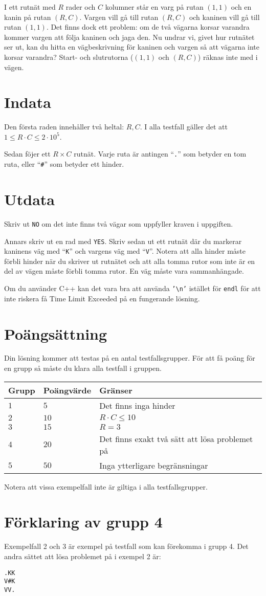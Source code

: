I ett rutnät med $R$ rader och $C$ kolumner står en varg på rutan $(1, 1)$ och en kanin på rutan $(R, C)$.
Vargen vill gå till rutan $(R, C)$ och kaninen vill gå till rutan $(1, 1)$.
Det finns dock ett problem: om de två vägarna korsar varandra kommer vargen att följa kaninen och jaga den.
Nu undrar vi, givet hur rutnätet ser ut, kan du hitta en vägbeskrivning för kaninen och vargen så att vägarna inte korsar varandra?
Start- och slutrutorna ($(1, 1)$ och $(R, C)$) räknas inte med i vägen.

\section*{Indata}
Den första raden innehåller två heltal: $R, C$. I alla testfall gäller det att $1 \leq R \cdot C \leq 2 \cdot 10^5$.

Sedan föjer ett $R \times C$ rutnät. Varje ruta är antingen ``\texttt{.}'' som betyder en tom ruta, eller ``\texttt{\#}'' som betyder ett hinder.

\section*{Utdata}
Skriv ut \texttt{NO} om det inte finns två vägar som uppfyller kraven i uppgiften.

Annars skriv ut en rad med \texttt{YES}.
Skriv sedan ut ett rutnät där du markerar kaninens väg med ``\texttt{K}'' och vargens väg med ``\texttt{V}''.
Notera att alla hinder måste förbli hinder när du skriver ut rutnätet och att alla tomma rutor som inte är en del av vägen måste förbli tomma rutor.
En väg måste vara sammanhängade.

Om du använder C++ kan det vara bra att använda \texttt{'\textbackslash{}n'} istället för \texttt{endl} för att inte riskera få Time Limit Exceeded på en fungerande lösning.

\section*{Poängsättning}
Din lösning kommer att testas på en antal testfallsgrupper.
För att få poäng för en grupp så måste du klara alla testfall i gruppen.

\noindent
\begin{tabular}{| l | l | p{12cm} |}
  \hline
  Grupp & Poängvärde & Gränser \\ \hline
  $1$   & $5$        & Det finns inga hinder\\ \hline
  $2$   & $10$       & $R \cdot C \leq 10$  \\ \hline
  $3$   & $15$       & $R= 3$  \\ \hline
  $4$   & $20$       & Det finns exakt två sätt att lösa problemet på  \\ \hline
  $5$   & $50$       & Inga ytterligare begränsningar  \\ \hline
\end{tabular}

Notera att vissa exempelfall inte är giltiga i alla testfallsgrupper.

\section*{Förklaring av grupp 4}
Exempelfall 2 och 3 är exempel på testfall som kan förekomma i grupp 4. Det andra sättet att lösa problemet på i exempel 2 är:

\begin{verbatim}
.KK
V#K
VV.
\end{verbatim}
